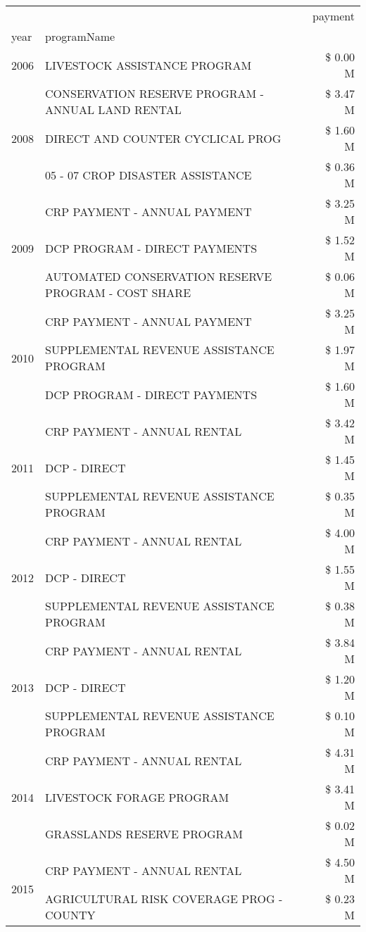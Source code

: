 \begin{tabular}{llr}
\toprule
 &  & payment \\
year & programName &  \\
\midrule
2006 & LIVESTOCK ASSISTANCE PROGRAM & \$ 0.00 M \\
\cline{1-3}
\multirow[t]{3}{*}{2008} & CONSERVATION RESERVE PROGRAM - ANNUAL LAND RENTAL & \$ 3.47 M \\
 & DIRECT AND COUNTER CYCLICAL PROG & \$ 1.60 M \\
 & 05 - 07 CROP DISASTER ASSISTANCE & \$ 0.36 M \\
\cline{1-3}
\multirow[t]{3}{*}{2009} & CRP PAYMENT - ANNUAL PAYMENT & \$ 3.25 M \\
 & DCP PROGRAM - DIRECT PAYMENTS & \$ 1.52 M \\
 & AUTOMATED CONSERVATION RESERVE PROGRAM - COST SHARE & \$ 0.06 M \\
\cline{1-3}
\multirow[t]{3}{*}{2010} & CRP PAYMENT - ANNUAL PAYMENT & \$ 3.25 M \\
 & SUPPLEMENTAL REVENUE ASSISTANCE PROGRAM & \$ 1.97 M \\
 & DCP PROGRAM - DIRECT PAYMENTS & \$ 1.60 M \\
\cline{1-3}
\multirow[t]{3}{*}{2011} & CRP PAYMENT - ANNUAL RENTAL & \$ 3.42 M \\
 & DCP - DIRECT & \$ 1.45 M \\
 & SUPPLEMENTAL REVENUE ASSISTANCE PROGRAM & \$ 0.35 M \\
\cline{1-3}
\multirow[t]{3}{*}{2012} & CRP PAYMENT - ANNUAL RENTAL & \$ 4.00 M \\
 & DCP - DIRECT & \$ 1.55 M \\
 & SUPPLEMENTAL REVENUE ASSISTANCE PROGRAM & \$ 0.38 M \\
\cline{1-3}
\multirow[t]{3}{*}{2013} & CRP PAYMENT - ANNUAL RENTAL & \$ 3.84 M \\
 & DCP - DIRECT & \$ 1.20 M \\
 & SUPPLEMENTAL REVENUE ASSISTANCE PROGRAM & \$ 0.10 M \\
\cline{1-3}
\multirow[t]{3}{*}{2014} & CRP PAYMENT - ANNUAL RENTAL & \$ 4.31 M \\
 & LIVESTOCK FORAGE PROGRAM & \$ 3.41 M \\
 & GRASSLANDS RESERVE PROGRAM & \$ 0.02 M \\
\cline{1-3}
\multirow[t]{3}{*}{2015} & CRP PAYMENT - ANNUAL RENTAL & \$ 4.50 M \\
 & AGRICULTURAL RISK COVERAGE PROG - COUNTY & \$ 0.23 M \\

\end{tabular}
